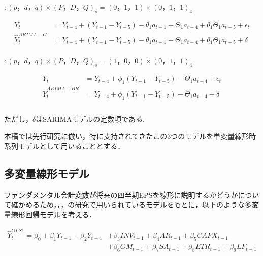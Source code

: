 \documentclass[a4paper，12pt]{jsarticle}
\begin{document}
\cite{griffin1977time} $: (p，d，q) \times (P，D，Q)_s = (0，1，1) \times (0，1，1)_4$

\begin{equation}
  \begin{split}
    Y_t &= Y_{t-4} + (Y_{t-1} - Y_{t-5}) - \theta_1a_{t-1} - \Theta_1a_{t-4} + \theta_1\Theta_1a_{t-5} + \epsilon_t \\
    \hat{Y}_t^{ARIMA-G} &= Y_{t-4} + (Y_{t-1} - Y_{t-5}) - \theta_1a_{t-1} - \Theta_1a_{t-4} + \theta_1\Theta_1a_{t-5} + \delta \\
  \end{split}
\end{equation}

\cite*{brown1979univariate} $: (p，d，q) \times (P，D，Q)_s = (1，0，0) \times (0，1，1)_4$

\begin{equation}
  \begin{split}    
    Y_t &= Y_{t-4} + \phi_1(Y_{t-1}-Y_{t-5}) - \Theta_1a_{t-4} + \epsilon_t \\
    \hat{Y}_t^{ARIMA-BR} &= Y_{t-4} + \phi_1(Y_{t-1}-Y_{t-5}) - \Theta_1a_{t-4} + \delta \\
    \\
  \end{split}
\end{equation}

ただし，$\delta$はSARIMAモデルの定数項である.

本稿では先行研究に倣い，特に支持されてきたこの3つのモデルを単変量線形時系列モデルとして用いることとする．

\subsection{多変量線形モデル}

ファンダメンタル会計変数が将来の四半期EPSを線形に説明するかどうかについて確かめるため，\cite*{lev1993fundamental}，\cite*{abarbanell1997fundamental}，\cite*{lorek1996multivariate}の研究で用いられているモデルをもとに，以下のような多変量線形回帰モデルを考える．

\begin{equation}
  \begin{split}
    \label{eq:ols1}
    \hat{Y}_t^{OLS1} = \beta_0 + \beta_1Y_{t-1} + \beta_2Y_{t-4} 
    &+ \beta_3INV_{t-1} + \beta_4AR_{t-1} + \beta_5CAPX_{t-1} \\
    &+ \beta_6GM_{t-1} + \beta_7SA_{t-1} + \beta_8ETR_{t-1} + \beta_9LF_{t-1} \\
  \end{split}
\end{equation}
\end{document}
